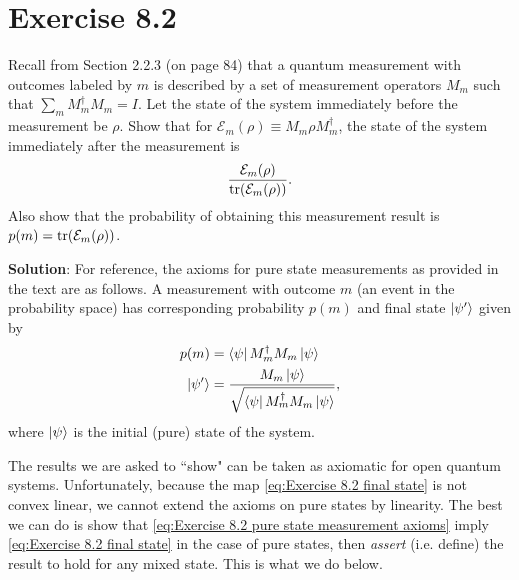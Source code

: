 \documentclass{book}
\newcommand{\mc}[1]{\mathcal{#1}}
\begin{document}
\section*{Exercise 8.2} 
    Recall from Section 2.2.3 (on page 84) that a quantum measurement with outcomes labeled by $m$ is described by a set of measurement operators $M_m$ such that $\sum_m M_m^\dagger M_m = I$. Let the state of the system immediately before the measurement be $\rho$. Show that for $\mc{E}_m(\rho) \equiv M_m \rho M_m^\dagger$, the state of the system immediately after the measurement is
    \begin{align} \label{eq:Exercise 8.2 final state}
        \frac{\mc{E}_m(\rho)}{\tr(\mc{E}_m(\rho))}.
    \end{align}
    Also show that the probability of obtaining this measurement result is $p(m) = \tr(\mc{E}_m(\rho))$.
    
    \textbf{Solution}: For reference, the axioms for pure state measurements as provided in the text are as follows. A measurement with outcome $m$ (an event in the probability space) has corresponding probability $p(m)$ and final state $\ket{\psi'}$ given by
    \begin{align} \label{eq:Exercise 8.2 pure state measurement axioms}
    \begin{aligned} 
        p(m) &= \bra{\psi}M_m^\dagger M_m \ket{\psi} \\
        \ket{\psi'} &= \frac{M_m \ket{\psi}}{\sqrt{\bra{\psi}M_m^\dagger M_m \ket{\psi}}},
    \end{aligned}
    \end{align}
    where $\ket{\psi}$ is the initial (pure) state of the system.
    
    The results we are asked to ``show" can be taken as axiomatic for open quantum systems. Unfortunately, because the map \eqref{eq:Exercise 8.2 final state} is not convex linear, we cannot extend the axioms on pure states by linearity. The best we can do is show that \eqref{eq:Exercise 8.2 pure state measurement axioms} imply \eqref{eq:Exercise 8.2 final state} in the case of pure states, then \emph{assert} (i.e. define) the result to hold for any mixed state. This is what we do below.
    
\end{document}
